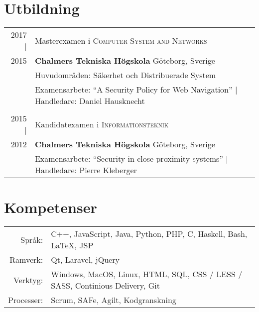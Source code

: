 \documentclass[a4paper,10pt]{scrartcl} %
\begin{document}

\section{Utbildning}

\begin{tabular}{r|p{15cm}}	
2017 |	                & Masterexamen i \textsc{Computer System and Networks} \\
2015			        & \textbf{Chalmers Tekniska Högskola} \hfill Göteborg, Sverige \\
\phantom{abcdefghijklm}	& Huvudområden: Säkerhet och Distribuerade System \\
				        & Examensarbete: ``A Security Policy for Web Navigation'' | \small Handledare: Daniel Hausknecht \\
\multicolumn{2}{c}{} \\


2015 |      	& Kandidatexamen i \textsc{Informationsteknik} \\
2012			& \textbf{Chalmers Tekniska Högskola} \hfill Göteborg, Sverige \\
				& Examensarbete: ``Security in close proximity systems'' | \small Handledare: Pierre Kleberger \\

\end{tabular}


\section{Kompetenser}

\begin{tabular}{rp{15cm}}
\phantom{abcde} Språk: 		    & C++, JavaScript, Java, Python, PHP, C, Haskell, Bash, \LaTeX, JSP \\
Ramverk:	                    & Qt, Laravel, jQuery \\
Verktyg:	                    & Windows, MacOS, Linux, HTML, SQL, CSS / LESS / SASS, Continious Delivery, Git \\
Processer:                      & Scrum, SAFe, Agilt, Kodgranskning 
\end{tabular}


\newpage
\end{document}
